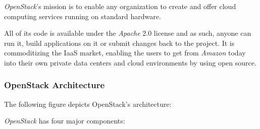 \textit{OpenStack}'s mission is to enable any organization to create and offer cloud computing services running on standard hardware.

All of its code is available under the \textit{Apache} 2.0 license and as such, anyone can run it, build applications on it or submit changes back to the project. It is commoditizing the IaaS market, enabling the users to get from \textit{Amazon} today into their own private data centers and cloud environments by using open source. \cite{https://github.com/dellcloudedge/crowbar/wiki/OpenStack-Essex-Deploy-Day}

\subsubsection*{OpenStack Architecture} \label{openstack_arch}
  
The following figure depicts OpenStack's architecture:


\textit{OpenStack} has four major components:

